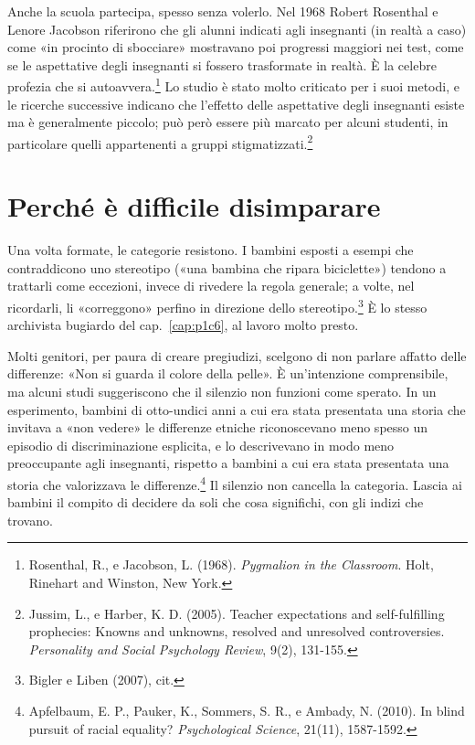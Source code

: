 Anche la scuola partecipa, spesso senza volerlo. Nel 1968 Robert Rosenthal e Lenore Jacobson riferirono che gli alunni indicati agli insegnanti (in realtà a caso) come «in procinto di sbocciare» mostravano poi progressi maggiori nei test, come se le aspettative degli insegnanti si fossero trasformate in realtà. È la celebre profezia che si autoavvera.\footnote{Rosenthal, R., e Jacobson, L. (1968). \textit{Pygmalion in the Classroom}. Holt, Rinehart and Winston, New York.} Lo studio è stato molto criticato per i suoi metodi, e le ricerche successive indicano che l'effetto delle aspettative degli insegnanti esiste ma è generalmente piccolo; può però essere più marcato per alcuni studenti, in particolare quelli appartenenti a gruppi stigmatizzati.\footnote{Jussim, L., e Harber, K. D. (2005). Teacher expectations and self-fulfilling prophecies: Knowns and unknowns, resolved and unresolved controversies. \textit{Personality and Social Psychology Review}, 9(2), 131-155.}

\section{Perché è difficile disimparare}

Una volta formate, le categorie resistono. I bambini esposti a esempi che contraddicono uno stereotipo («una bambina che ripara biciclette») tendono a trattarli come eccezioni, invece di rivedere la regola generale; a volte, nel ricordarli, li «correggono» perfino in direzione dello stereotipo.\footnote{Bigler e Liben (2007), cit.} È lo stesso archivista bugiardo del cap.~\ref{cap:p1c6}, al lavoro molto presto.

Molti genitori, per paura di creare pregiudizi, scelgono di non parlare affatto delle differenze: «Non si guarda il colore della pelle». È un'intenzione comprensibile, ma alcuni studi suggeriscono che il silenzio non funzioni come sperato. In un esperimento, bambini di otto-undici anni a cui era stata presentata una storia che invitava a «non vedere» le differenze etniche riconoscevano meno spesso un episodio di discriminazione esplicita, e lo descrivevano in modo meno preoccupante agli insegnanti, rispetto a bambini a cui era stata presentata una storia che valorizzava le differenze.\footnote{Apfelbaum, E. P., Pauker, K., Sommers, S. R., e Ambady, N. (2010). In blind pursuit of racial equality? \textit{Psychological Science}, 21(11), 1587-1592.} Il silenzio non cancella la categoria. Lascia ai bambini il compito di decidere da soli che cosa significhi, con gli indizi che trovano.

